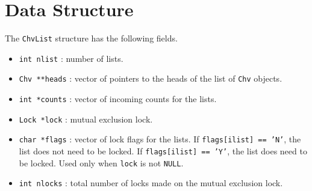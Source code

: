 \par
\section{Data Structure}
\label{section:ChvList:dataStructure}
\par
\par
The {\tt ChvList} structure has the following fields.
\begin{itemize}
\item
{\tt int nlist} : number of lists.
\item
{\tt Chv **heads} : 
vector of pointers to the heads of the list of {\tt Chv} objects.
\item
{\tt int *counts} : vector of incoming counts for the lists.
\item
{\tt Lock *lock} : mutual exclusion lock.
\item
{\tt char *flags} : vector of lock flags for the lists.
If {\tt flags[ilist] == 'N'}, the list does not need to be locked.
If {\tt flags[ilist] == 'Y'}, the list does need to be locked.
Used only when {\tt lock} is not {\tt NULL}.
\item
{\tt int nlocks} : 
total number of locks made on the mutual exclusion lock.
\end{itemize}
